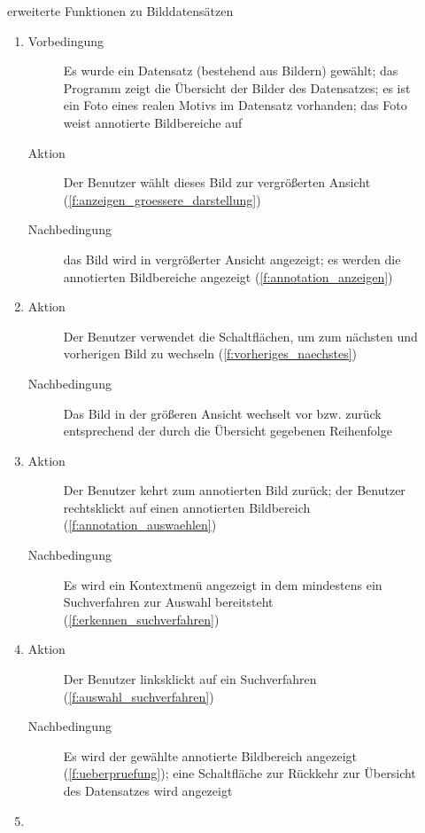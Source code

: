 \begin{description}
	\item[] erweiterte Funktionen zu Bilddatensätzen
	\begin{enumerate}
		\item
		\begin{description}
			\item[Vorbedingung] Es wurde ein Datensatz (bestehend aus Bildern) gewählt; das Programm zeigt die Übersicht der Bilder des Datensatzes; es ist ein Foto eines realen Motivs im Datensatz vorhanden; das Foto weist annotierte Bildbereiche auf
			\item[Aktion] Der Benutzer wählt dieses Bild zur vergrößerten Ansicht (\ref{f:anzeigen_groessere_darstellung})
			\item[Nachbedingung] das Bild wird in vergrößerter Ansicht angezeigt; es werden die annotierten Bildbereiche angezeigt (\ref{f:annotation_anzeigen})
		\end{description}
		\item
		\begin{description}
			\item[Aktion] Der Benutzer verwendet die Schaltflächen, um zum nächsten und vorherigen Bild zu wechseln (\ref{f:vorheriges_naechstes})
			\item[Nachbedingung] Das Bild in der größeren Ansicht wechselt vor bzw. zurück entsprechend der durch die Übersicht gegebenen Reihenfolge
		\end{description}
		\item
		\begin{description}
			\item[Aktion] Der Benutzer kehrt zum annotierten Bild zurück; der Benutzer rechtsklickt auf einen annotierten Bildbereich (\ref{f:annotation_auswaehlen})
			\item[Nachbedingung] Es wird ein Kontextmenü angezeigt in dem mindestens ein Suchverfahren zur Auswahl bereitsteht (\ref{f:erkennen_suchverfahren})
		\end{description}
		\item
		\begin{description}
			\item[Aktion] Der Benutzer linksklickt auf ein Suchverfahren (\ref{f:auswahl_suchverfahren})
			\item[Nachbedingung] Es wird der gewählte annotierte Bildbereich angezeigt (\ref{f:ueberpruefung}); eine Schaltfläche zur Rückkehr zur Übersicht des Datensatzes wird angezeigt
		\end{description}
		\item

\end{enumerate}
\end{description}
